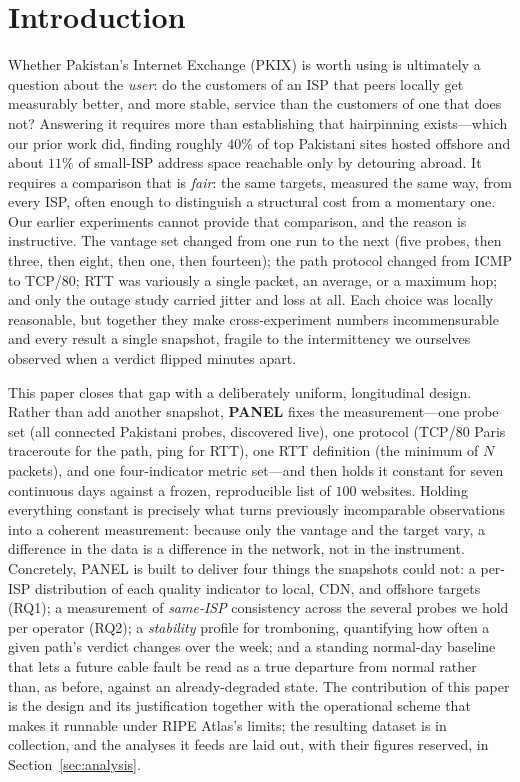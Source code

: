 \documentclass[conference]{IEEEtran}
\begin{document}
\section{Introduction}
Whether Pakistan's Internet Exchange (PKIX) is worth using is ultimately a question about the
\emph{user}: do the customers of an ISP that peers locally get measurably better, and more stable,
service than the customers of one that does not? Answering it requires more than establishing that
hairpinning exists---which our prior work did, finding roughly $40\%$ of top Pakistani sites hosted
offshore and about $11\%$ of small-ISP address space reachable only by detouring abroad. It
requires a comparison that is \emph{fair}: the same targets, measured the same way, from every ISP,
often enough to distinguish a structural cost from a momentary one. Our earlier experiments cannot
provide that comparison, and the reason is instructive. The vantage set changed from one run to the
next (five probes, then three, then eight, then one, then fourteen); the path protocol changed from
ICMP to TCP/80; RTT was variously a single packet, an average, or a maximum hop; and only the
outage study carried jitter and loss at all. Each choice was locally reasonable, but together they
make cross-experiment numbers incommensurable and every result a single snapshot, fragile to the
intermittency we ourselves observed when a verdict flipped minutes apart.

This paper closes that gap with a deliberately uniform, longitudinal design. Rather than add another
snapshot, \textbf{PANEL} fixes the measurement---one probe set (all connected Pakistani probes,
discovered live), one protocol (TCP/80 Paris traceroute for the path, ping for RTT), one RTT
definition (the minimum of $N$ packets), and one four-indicator metric set---and then holds it
constant for seven continuous days against a frozen, reproducible list of $100$ websites. Holding
everything constant is precisely what turns previously incomparable observations into a coherent
measurement: because only the vantage and the target vary, a difference in the data is a difference
in the network, not in the instrument. Concretely, PANEL is built to deliver four things the
snapshots could not: a per-ISP distribution of each quality indicator to local, CDN, and offshore
targets (RQ1); a measurement of \emph{same-ISP} consistency across the several probes we hold per
operator (RQ2); a \emph{stability} profile for tromboning, quantifying how often a given path's
verdict changes over the week; and a standing normal-day baseline that lets a future cable fault be
read as a true departure from normal rather than, as before, against an already-degraded state. The
contribution of this paper is the design and its justification together with the operational scheme
that makes it runnable under RIPE Atlas's limits; the resulting dataset is in collection, and the
analyses it feeds are laid out, with their figures reserved, in Section~\ref{sec:analysis}.
\end{document}
